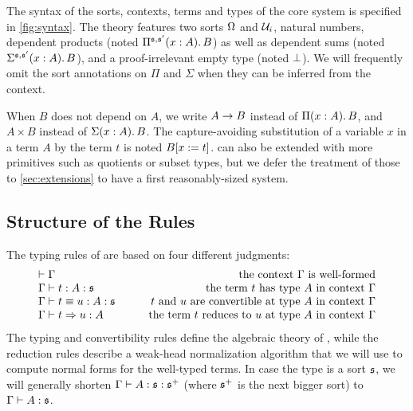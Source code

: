 The syntax of the sorts, contexts, terms and types of the core system is
specified in \cref{fig:syntax}.
%
The theory features two sorts \( \sProp \) and \( \Type_i \), natural numbers, dependent products 
(noted $\Depfunannotated{A}{B}{}{\Univ}{\Univ'}$) as well as dependent
sums (noted $\Depsumannotated{A}{B}{}{\Univ}{\Univ'}$), and a proof-irrelevant 
empty type (noted $\Empty$).
% 
We will frequently omit the sort annotations on \( \Pi \) and \( \Sigma \) when 
they can be inferred from the context.

When \( B \) does not depend on \( A \), we write \( \Fun{A}{B} \) instead of
\( \Depfun{A}{B} \), and \( A \times B \) instead of \( \Depsum{A}{B} \). The capture-avoiding
substitution of a variable \( x \) in a term \( A \) by the term \( t \) is noted
\( \subst{B}{t} \).
%
\SetoidCC can also be extended with more primitives such as quotients or subset 
types, but we defer the treatment of those to \cref{sec:extensions} to 
have a first reasonably-sized system.

\subsection{Structure of the Rules}

The typing rules of \SetoidCC are based on four different judgments: 
\[
  \begin{array}{lr}
	\wfctx{\Gamma} & \text{the context \( \Gamma \) is well-formed} \\
	\tytmannotated{\Gamma}{t}{A}{\Univ} & \text{the term \( t \) has type \( A \) in context \( \Gamma \)} \\
	\eqtmannotated{\Gamma}{t}{u}{A}{\Univ} & \text{\( t \) and \( u \) are convertible at type \( A \) in context \( \Gamma \)} \\
	\redannotated{\Gamma}{t}{u}{A} & \qquad\text{the term \( t \) reduces to \( u \) at type \( A \) in context \( \Gamma \)}
  \end{array}
\]
The typing and convertibility rules define the algebraic theory of 
\SetoidCC, while the reduction rules describe a weak-head normalization 
algorithm that we will use to compute normal forms for the well-typed 
terms.
% 
In case the type is a sort \( \Univ \), we will generally shorten 
\( \tytmannotated{\Gamma}{A}{\Univ}{\Univ^+} \) (where \( \Univ^+ \) is the next 
bigger sort) to \( \tytm{\Gamma}{A}{\Univ} \).

